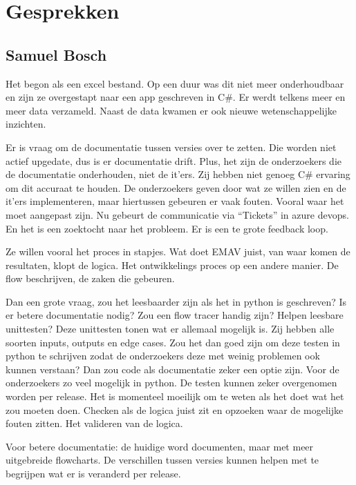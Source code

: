 
\chapter{Gesprekken}
\label{ch:gesprekken}

\section{Samuel Bosch}
Het begon als een excel bestand.
Op een duur was dit niet meer onderhoudbaar en zijn ze overgestapt naar een app geschreven in C\#.
Er werdt telkens meer en meer data verzameld.
Naast de data kwamen er ook nieuwe wetenschappelijke inzichten.

Er is vraag om de documentatie tussen versies over te zetten.
Die worden niet actief upgedate, dus is er documentatie drift.
Plus, het zijn de onderzoekers die de documentatie onderhouden, niet de it'ers.
Zij hebben niet genoeg C\# ervaring om dit accuraat te houden.
De onderzoekers geven door wat ze willen zien en de it'ers implementeren, maar hiertussen gebeuren er vaak fouten.
Vooral waar het moet aangepast zijn.
Nu gebeurt de communicatie via ``Tickets'' in azure devops.
En het is een zoektocht naar het probleem.
Er is een te grote feedback loop.

Ze willen vooral het proces in stapjes.
Wat doet EMAV juist, van waar komen de resultaten, klopt de logica.
Het ontwikkelings proces op een andere manier.
De flow beschrijven, de zaken die gebeuren.

Dan een grote vraag, zou het leesbaarder zijn als het in python is geschreven?
Is er betere documentatie nodig?
Zou een flow tracer handig zijn?
Helpen leesbare unittesten?
Deze unittesten tonen wat er allemaal mogelijk is.
Zij hebben alle soorten inputs, outputs en edge cases.
Zou het dan goed zijn om deze testen in python te schrijven zodat de onderzoekers deze met weinig problemen ook kunnen verstaan?
Dan zou code als documentatie zeker een optie zijn. Voor de onderzoekers zo veel mogelijk in python.
De testen kunnen zeker overgenomen worden per release.
Het is momenteel moeilijk om te weten als het doet wat het zou moeten doen. Checken als de logica juist zit en opzoeken waar de mogelijke fouten zitten.
Het valideren van de logica.

Voor betere documentatie:
de huidige word documenten, maar met meer uitgebreide flowcharts.
De verschillen tussen versies kunnen helpen met te begrijpen wat er is veranderd per release.

